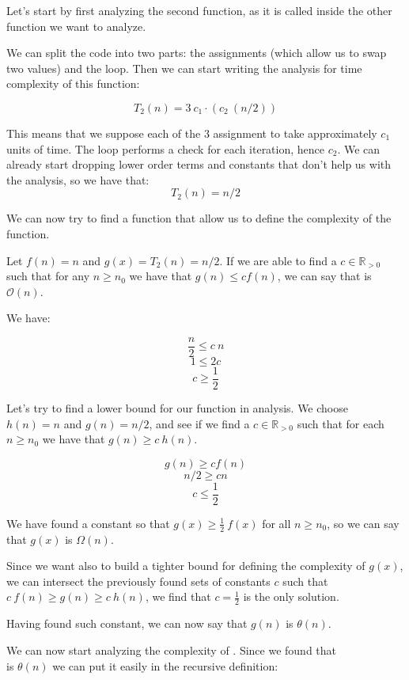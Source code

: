 \documentclass[12pt]{article}
\newcommand{\realpositivenumbers}{\mathbb{R}_{>0}} %
\newcommand{\bigO}{\mathcal{O}}
\begin{document}
Let's start by first analyzing the second function,  as it is called inside the other function we want to 
analyze. 

We can split the code into two parts: the assignments (which allow us to swap two values) and the loop.
Then we can start writing the analysis for time complexity of this function: 

$$ T_2(n) = 3\ c_1 \cdot (c_2\ (n/2))$$

This means that we suppose each of the 3 assignment to take approximately $c_1$ units of time. The loop performs a check for
each iteration, hence $c_2$.
We can already start dropping lower order terms and constants that don't help us with the analysis, so we have that:
$$ T_2(n) = n/2 $$

We can now try to find a function that allow us to define the complexity of the  function.
\vspace{.4cm}

Let $f(n) = n $ and $g(x) = T_2(n) = n/2$. If we are able to find a $c \in \realpositivenumbers$ such that for 
any $n \geq n_0$ we have that $g(n) \leq cf(n)$, we can say that  is $\bigO(n)$.

We have:

$$ \frac{n}{2} \leq c\ n $$
$$ 1 \leq 2c $$
$$ c \geq \frac{1}{2} $$

Let's try to find a lower bound for our function in analysis. We choose $h(n) = n$ and $g(n) = n / 2$, and see if we find a $c \in \realpositivenumbers $ such that for each $n \geq n_0$ we have that $g(n) \geq c\ h(n)$.

$$ g(n) \geq c f(n) $$
$$ n/2 \geq c n $$
$$ c \leq \frac{1}{2} $$

We have found a constant so that $g(x) \geq \frac{1}{2}\ f(x)$ for all $n \geq n_0$, so we can say that $g(x)$ is $\Omega(n)$.
\vspace{.4cm}

Since we want also to build a tighter bound for defining the complexity of $g(x)$, we can intersect the previously found sets of constants $c$ such that $c\ f(n) \geq g(n) \geq c\ h(n)$, we find that $c = \frac{1}{2}$ is the only solution.

Having found such constant, we can now say that $g(n)$ is $\theta (n)$.
\pagebreak

We can now start analyzing the complexity of . Since we found that \\  is $\theta(n)$ we 
can put it easily in the  recursive definition:
\end{document}

